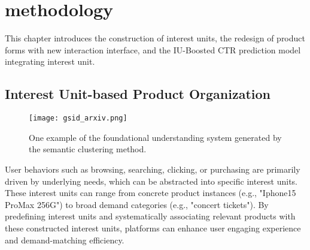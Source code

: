\section{methodology}
This chapter introduces the construction of interest units, the redesign of product forms with new interaction interface, and the IU-Boosted CTR prediction model integrating interest unit.

\subsection{Interest Unit-based Product Organization}

\begin{figure}[tbp]
\texttt{[image: gsid\_arxiv.png]}
\caption{One example of the foundational understanding system generated by the semantic clustering method.}
\label{fig:gsid_tree}
\end{figure}

User behaviors such as browsing, searching, clicking, or purchasing are primarily driven by underlying needs, which can be abstracted into specific interest units. These interest units can range from concrete product instances (e.g., "Iphone15 ProMax 256G") to broad demand categories (e.g., "concert tickets"). 
By predefining interest units and systematically associating relevant products with these constructed interest units, platforms can enhance user engaging experience and demand-matching efficiency.

